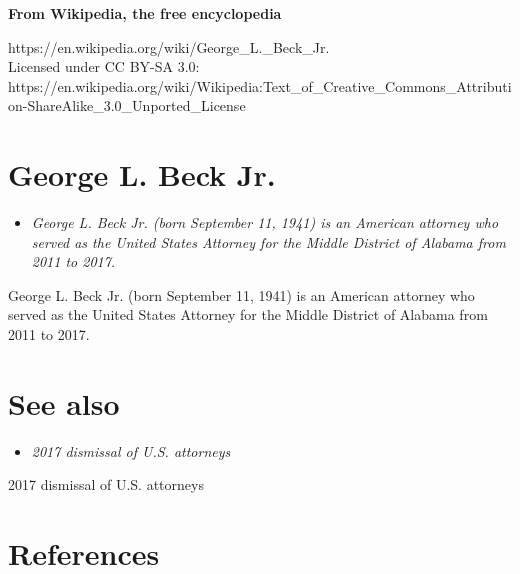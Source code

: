 \textbf{From Wikipedia, the free encyclopedia}

https://en.wikipedia.org/wiki/George\_L.\_Beck\_Jr.\\
Licensed under CC BY-SA 3.0:\\
https://en.wikipedia.org/wiki/Wikipedia:Text\_of\_Creative\_Commons\_Attribution-ShareAlike\_3.0\_Unported\_License

\section{George L. Beck Jr.}\label{george-l.-beck-jr.}

\begin{itemize}
\item
  \emph{George L. Beck Jr. (born September 11, 1941) is an American
  attorney who served as the United States Attorney for the Middle
  District of Alabama from 2011 to 2017.}
\end{itemize}

George L. Beck Jr. (born September 11, 1941) is an American attorney who
served as the United States Attorney for the Middle District of Alabama
from 2011 to 2017.

\section{See also}\label{see-also}

\begin{itemize}
\item
  \emph{2017 dismissal of U.S. attorneys}
\end{itemize}

2017 dismissal of U.S. attorneys

\section{References}\label{references}
